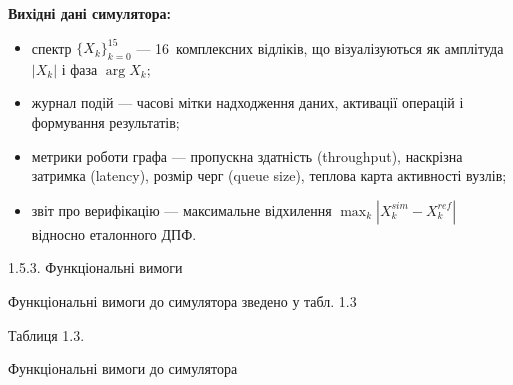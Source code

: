 \textbf{Вихідні дані симулятора:}

\begin{itemize}
\item
  спектр \(\{ X_{k}\}_{k = 0}^{15}\) --- 16~комплексних відліків, що
  візуалізуються як амплітуда \(|X_{k}|\) і фаза \(\arg X_{k}\);
\item
  журнал подій --- часові мітки надходження даних, активації операцій і
  формування результатів;
\item
  метрики роботи графа --- пропускна здатність (throughput), наскрізна
  затримка (latency), розмір черг (queue size), теплова карта активності
  вузлів;
\item
  звіт про верифікацію --- максимальне відхилення
  \(\max_{k}|X_{k}^{sim} - X_{k}^{ref}|\) відносно еталонного ДПФ.
\end{itemize}

1.5.3. Функціональні вимоги

Функціональні вимоги до симулятора зведено у табл. 1.3

Таблиця 1.3.

Функціональні вимоги до симулятора

